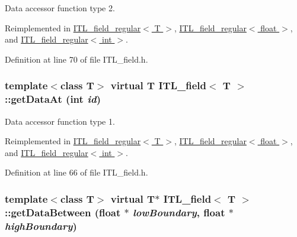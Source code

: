 Data accessor function type 2. 



Reimplemented in \hyperlink{classITL__field__regular_ad05668c219a4632a3ceaca8409339103}{ITL\_\-field\_\-regular$<$ T $>$}, \hyperlink{classITL__field__regular_ad05668c219a4632a3ceaca8409339103}{ITL\_\-field\_\-regular$<$ float $>$}, and \hyperlink{classITL__field__regular_ad05668c219a4632a3ceaca8409339103}{ITL\_\-field\_\-regular$<$ int $>$}.



Definition at line 70 of file ITL\_\-field.h.

\hypertarget{classITL__field_a9a4b41fbeafd49afde45b608b5db2c09}{
\subsubsection[{getDataAt}]{\setlength{\rightskip}{0pt plus 5cm}template$<$class T$>$ virtual T {\bf ITL\_\-field}$<$ T $>$::getDataAt (int {\em id})}}
\label{classITL__field_a9a4b41fbeafd49afde45b608b5db2c09}


Data accessor function type 1. 



Reimplemented in \hyperlink{classITL__field__regular_a78f814d7617aeb01c63def2f5f2e9caa}{ITL\_\-field\_\-regular$<$ T $>$}, \hyperlink{classITL__field__regular_a78f814d7617aeb01c63def2f5f2e9caa}{ITL\_\-field\_\-regular$<$ float $>$}, and \hyperlink{classITL__field__regular_a78f814d7617aeb01c63def2f5f2e9caa}{ITL\_\-field\_\-regular$<$ int $>$}.



Definition at line 66 of file ITL\_\-field.h.

\hypertarget{classITL__field_a983bd8b95e95bf758a73fafccea62a49}{
\subsubsection[{getDataBetween}]{\setlength{\rightskip}{0pt plus 5cm}template$<$class T$>$ virtual T$\ast$ {\bf ITL\_\-field}$<$ T $>$::getDataBetween (float $\ast$ {\em lowBoundary}, \/  float $\ast$ {\em highBoundary})}}
\label{classITL__field_a983bd8b95e95bf758a73fafccea62a49}


